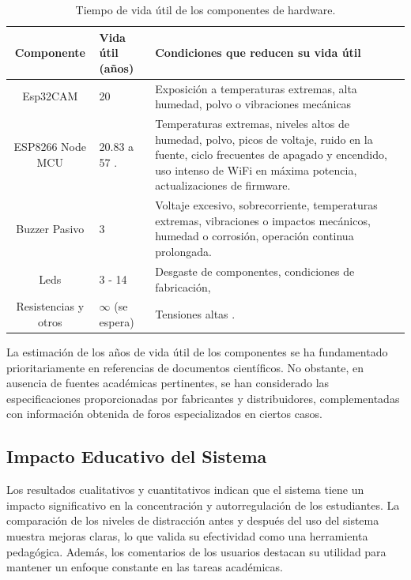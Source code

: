 \documentclass[a4paper,fleqn]{cas-sc}
\begin{document}
				\begin{table}[h]
					\centering
					\caption{Tiempo de vida útil de los componentes de hardware.}
					\label{tab:ShelfLife}
					\begin{tabularx}{\textwidth}{cXX}
						\toprule
						\textbf{Componente} & \textbf{Vida útil (años)} & Condiciones que reducen su vida útil\\
						\midrule
						Esp32CAM & 20 \citep{Espressif2022ESP32-CAM,Espressif2022ESP32Forum} & Exposición a temperaturas extremas, alta humedad, polvo o vibraciones mecánicas\\
						ESP8266 Node MCU & 20.83 \citep{Amri2018Improving} a 57 \citep{Ardumotica2023,Espressif2022ESP32Forum}. & Temperaturas extremas, niveles altos de humedad, polvo, picos de voltaje, ruido en la fuente, ciclo frecuentes de apagado y encendido, uso intenso de WiFi en máxima potencia, actualizaciones de firmware.\\
						Buzzer Pasivo & 3 \citep{HuawhaElectronics} & Voltaje excesivo, sobrecorriente, temperaturas extremas, vibraciones o impactos mecánicos, humedad o corrosión, operación continua prolongada. \\
						Leds & 3 \citep{Casamayor2015} - 14 \citep{Cary,GreenLighting2024} & Desgaste de componentes, condiciones de fabricación, \\
						Resistencias y otros & $\infty$ (se espera) & Tensiones altas \citep{Simon2017Evolution}. \\
						\bottomrule
					\end{tabularx}
				\end{table}
				La estimación de los años de vida útil de los componentes se ha fundamentado prioritariamente en referencias de documentos científicos. No obstante, en ausencia de fuentes académicas pertinentes, se han considerado las especificaciones proporcionadas por fabricantes y distribuidores, complementadas con información obtenida de foros especializados en ciertos casos.
		
		\subsection{Impacto Educativo del Sistema}
			Los resultados cualitativos y cuantitativos indican que el sistema tiene un impacto significativo en la concentración y autorregulación de los estudiantes. La comparación de los niveles de distracción antes y después del uso del sistema muestra mejoras claras, lo que valida su efectividad como una herramienta pedagógica. Además, los comentarios de los usuarios destacan su utilidad para mantener un enfoque constante en las tareas académicas.
			
\end{document}
